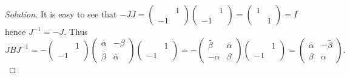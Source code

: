 \documentclass{article}
\theoremstyle{definition}
\theoremstyle{plain}
\begin{document}
\begin{adjustwidth}{0.7cm}{}
\color{blue}
\begin{proof}[Solution]
It is easy to see that $-JJ=\begin{pmatrix}&1\\ -1&\end{pmatrix}\begin{pmatrix}&1\\ -1&\end{pmatrix}=\begin{pmatrix}1&\\ &1\end{pmatrix}=I$ hence $J^{-1}=-J$. Thus
\begin{displaymath}
JBJ^{-1}=-\begin{pmatrix}&1\\ -1&\end{pmatrix}\begin{pmatrix}\alpha&-\beta\\ \bar{\beta}&\bar{\alpha}\end{pmatrix}\begin{pmatrix}&1\\ -1&\end{pmatrix}=-\begin{pmatrix}\bar{\beta}&\bar{\alpha}\\ -\alpha&\beta\end{pmatrix}\begin{pmatrix}&1\\ -1&\end{pmatrix}=\begin{pmatrix}\bar{\alpha}&-\bar{\beta}\\ \beta&\alpha\end{pmatrix}.
\end{displaymath}
\color{black}
\end{proof}
\end{adjustwidth}
\end{document}
